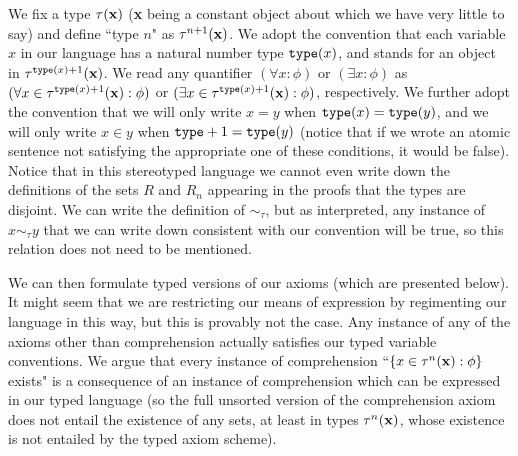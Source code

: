 \documentclass[12pt]{book}
\begin{document}
We fix a type $\tau({\bf x})$ ({\bf x} being a constant object about which we have very little to say) and define ``type $n$" as $\tau^{n+1}({\bf x})$.  We adopt the convention that each variable $x$ in our language has a natural number type ${\tt type}(x)$,
and stands for an object in $\tau^{{\tt type}(x)+1}({\bf x})$.
We read any quantifier $(\forall x:\phi)$ or $(\exists x:\phi)$ as $(\forall x\in \tau^{{\tt type}(x)+1}({\bf x}):\phi)$ or $(\exists x\in \tau^{{\tt type}(x)+1}({\bf x}):\phi)$, respectively.
We further adopt the convention that we will only write $x=y$ when ${\tt type}(x)={\tt type}(y)$, and we will only write $x \in y$ when ${\tt type}+1 = {\tt type}(y)$
(notice that if we wrote an atomic sentence not satisfying the appropriate one of these conditions, it would be false).  Notice that in this stereotyped language we cannot even write down the definitions of the sets $R$ and $R_n$ appearing in the proofs that the types are disjoint.  We can write the definition of $\sim_\tau$, but as interpreted, any instance
of $x \sim_\tau y$ that we can write down consistent with our convention will be true, so this relation does not need to be mentioned.

We can then formulate typed versions of our axioms (which are presented below).  It might seem that we are restricting our means of expression by regimenting our
language in this way, but this is provably not the case.  Any instance of any of the axioms other than comprehension actually satisfies our typed variable conventions.
We argue that every instance of comprehension ``$\{x \in \tau^n({\bf x}):\phi\}$ exists" is a consequence of an instance of comprehension which can be expressed in our typed
language (so the full unsorted version of the comprehension axiom does not entail the existence of any sets, at least in types $\tau^n({\bf x})$, whose existence is not entailed by the typed axiom scheme).
\end{document}
